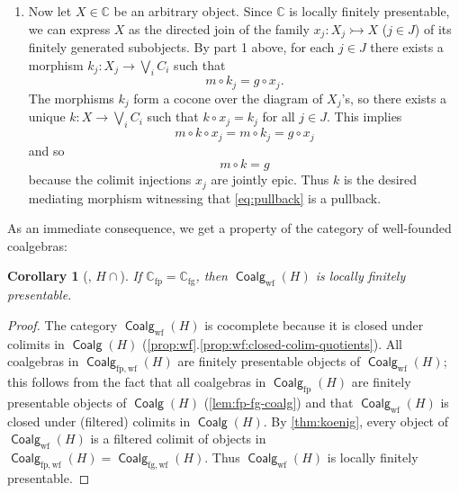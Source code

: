 \documentclass[10pt,a4paper]{article}
\makeatletter
\newtheorem{corollary}[theorem]{Corollary}
\theoremstyle{definition}
\theoremstyle{remark}
\numberwithin{equation}{section}
\providecommand{\oname}[1]{{\mathop{\mathsf{#1}}\xspace}}
\providecommand{\inr}{\oname{inr}}
\newcommand{\lfplong}{locally finitely presentable\xspace}
\newcommand{\lfp}{\lfplong}
\newcommand{\ar}{\mathsf{ar}}
\providecommand{\C}{}
\newcommand{\fp}{{\mathrm{fp}}}
\newcommand{\fg}{{\mathrm{fg}}}
\newcommand{\wf}{{\mathrm{wf}}}
\renewcommand{\C}{{\mathbb{C}}}
\newcommand{\iref}[2]{\autoref{#1}.\ref{#1:#2}}
\DeclareMathOperator{\Coalg}{\mathsf{Coalg}}
\newcommand{\monoto}{\rightarrowtail}
\let\oldqedhere\qedhere
\def\qedhere{\global\def\proofappendix@qedsymbolmissing{}\oldqedhere}
\newenvironment{proofhere}[2][Proof of]{    \proof{#1~\autoref{#2}}    }{  \endproof  \par}
\newenvironment{proofappendix}[2][Proof of]{    \begin{proofhere}[#1]{#2}\label{#2:proof}
  }{    \end{proofhere}
  }
\newcommand{\injmono}{\ensuremath{\overset{\smash{\raisebox{-1pt}{\ensuremath{\scriptstyle+}}}}{\rightarrowtail}}}\newcommand{\hpresint}{\ensuremath{H\cap}\xspace}
\theoremstyle{plain}
\theoremstyle{definition}
\makeatother
\begin{document}
\begin{proofappendix}{thm:koenig}
\begin{enumerate}
\begin{equation}
\end{equation}
Indeed, commutativity of the left-hand part is witnessed by the following diagram:
\[
\begin{tikzcd}
X  \ar{d}[swap]{g} \ar[shiftarr={yshift=7mm}]{rrr}{k} \ar{r}{\inr} & C_i+X \ar{d}{[m_i,g]} \ar{r}{e} & C_j \ar{d}{m_j} \ar{r}{n_i} & \bigvee_i C_i \ar{d}{m} \\
C \ar[equals]{r} & C \ar[equals]{r} & C \ar[equals]{r} & C 
\end{tikzcd}
\]
Then also the upper part of \eqref{eq:pb-proof} commutes because it does so when postcomposed with the monomorphism $Hm$. The uniqueness of $k$ follows from $m$ being monic.
\item Now let $X\in \C$ be an arbitrary object. Since $\C$ is \lfp, we can express $X$ as the directed join of the family $x_j\colon X_j\monoto X$ ($j\in J$) of its finitely generated subobjects. By part 1 above, for each $j\in J$ there exists a morphism $k_j\colon X_j\to \bigvee_i C_i$ such that
\[ m\circ k_j = g\circ x_j. \]
The morphisms $k_j$ form a cocone over the diagram of $X_j$'s, so there exists a unique $k\colon X\to \bigvee_i C_i$ such that $k\circ x_j = k_j$ for all $j\in J$. This implies
\[ m\circ k\circ x_j = m\circ k_j = g\circ x_j  \]
and so
\[ m\circ k = g \]
because the colimit injections $x_j$ are jointly epic. Thus $k$ is the desired mediating morphism witnessing that \eqref{eq:pullback} is a pullback.\qedhere
\end{enumerate}
\end{proofappendix}


As an immediate consequence, we get a property of the category of well-founded coalgebras:

\begin{corollary}[\smash{\injmono}, \hpresint]\label{cor:wfIsLFP}
If $\C_\fp=\C_\fg$, then $\Coalg_\wf(H)$ is \lfp. 
\end{corollary}

\begin{proof}
The category $\Coalg_\wf(H)$ is cocomplete because it is closed under colimits in $\Coalg(H)$ (\iref{prop:wf}{closed-colim-quotients}). All coalgebras in $\Coalg_{\fp,\wf}(H)$ 
are finitely presentable objects of $\Coalg_\wf(H)$; this follows from the fact that all coalgebras in $\Coalg_\fp(H)$ are finitely presentable objects of $\Coalg(H)$ (\autoref{lem:fp-fg-coalg}) and that $\Coalg_\wf(H)$ is closed under (filtered) colimits in $\Coalg(H)$. By \autoref{thm:koenig}, every object of $\Coalg_\wf(H)$ is a filtered colimit of objects in $\Coalg_{\fp,\wf}(H)=\Coalg_{\fg,\wf}(H)$. Thus $\Coalg_\wf(H)$ is \lfp. 
\end{proof}
\end{document}

